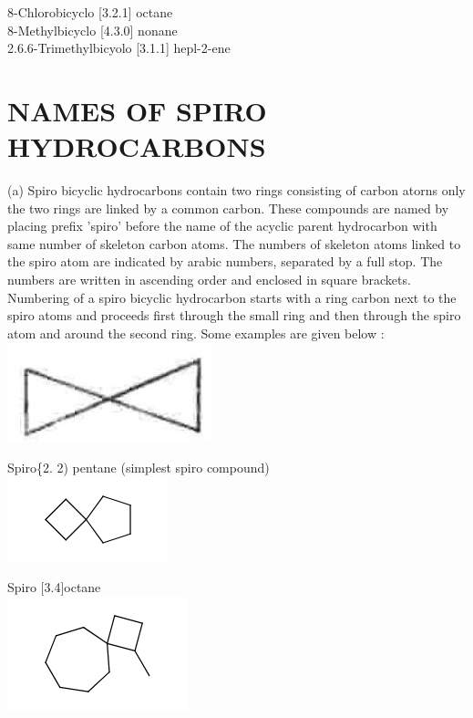 \documentclass[10pt]{article}
\begin{document}
8-Chlorobicyclo [3.2.1] octane\\[0pt]
8-Methylbicyclo [4.3.0] nonane\\[0pt]
2.6.6-Trimethylbicyolo [3.1.1] hepl-2-ene

\section*{NAMES OF SPIRO HYDROCARBONS}
(a) Spiro bicyclic hydrocarbons contain two rings consisting of carbon atorns only the two rings are linked by a common carbon. These compounds are named by placing prefix 'spiro' before the name of the acyclic parent hydrocarbon with same number of skeleton carbon atoms. The numbers of skeleton atoms linked to the spiro atom are indicated by arabic numbers, separated by a full stop. The numbers are written in ascending order and enclosed in square brackets. Numbering of a spiro bicyclic hydrocarbon starts with a ring carbon next to the spiro atoms and proceeds first through the small ring and then through the spiro atom and around the second ring. Some examples are given below :\\
\includegraphics[max width=\textwidth, center]{2025_01_28_8470952b98110cec3aabg-035}

Spiro\{2. 2) pentane (simplest spiro compound)\\
\includegraphics{smile-93bda916227cc944654c0e0dcf19227ee18631ff}

Spiro [3.4]octane\\
\includegraphics{smile-44e352e87bd48eafd51dc31278b0d9de930bd29d}
\end{document}
